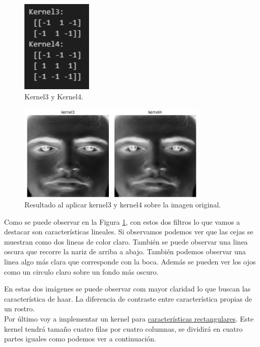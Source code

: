 \documentclass[a4paper]{article}
\begin{document}
\begin{figure}[H]
    \centering
    \includegraphics[width=0.30\textwidth]{../img/k3k4.png}
    \caption{Kernel3 y Kernel4.}
\end{figure}

\begin{figure}[H]
    \centering
    \includegraphics[width=0.80\textwidth]{../img/resultadok3k4.png}
    \caption{Resultado al aplicar kernel3 y kernel4 sobre la imagen original.}
    \label{fig:k3k4}
\end{figure}

Como se puede observar en la Figura \ref{fig:k3k4}, con estos dos filtros lo que vamos a destacar son características lineales.
Si observamos podemos ver que las cejas se muestran como dos lineas de color claro.
También se puede observar una linea oscura que recorre la nariz de arriba a abajo.
También podemos observar una linea algo más clara que corresponde con la boca.
Además se pueden ver los ojos como un circulo claro sobre un fondo más oscuro.

En estas dos imágenes se puede observar com mayor claridad lo que buscan las característica de haar.
La diferencia de contraste entre característica propias de un rostro.\\

Por último voy a implementar un kernel para \underline{características rectangulares}.
Este kernel tendrá tamaño cuatro filas por cuatro columnas, se dividirá en cuatro partes iguales como podemos ver a continuación.
\end{document}
